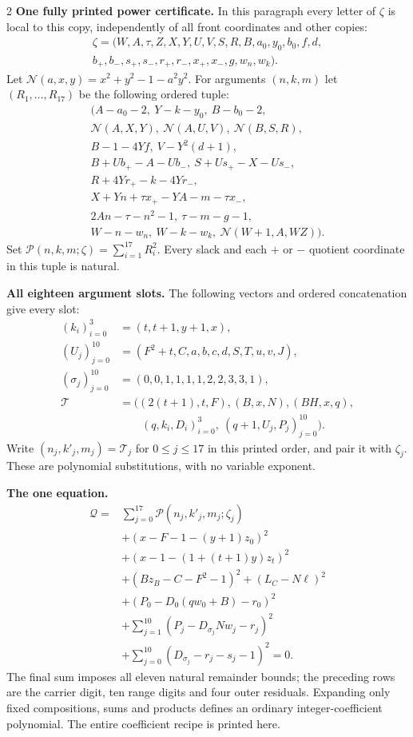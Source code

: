 \documentclass[10pt,letterpaper]{article}
\newcommand{\PP}{\mathcal P}
\newcommand{\QQ}{\mathcal Q}
\begin{document}
\begin{multicols}{2}
\textbf{One fully printed power certificate.}
In this paragraph every letter of $\zeta$ is local to this copy,
independently of all front coordinates and other copies:
\[
\begin{gathered}
\zeta=(W,A,\tau,Z,X,Y,U,V,S,R,B,a_0,y_0,b_0,f,d,\\
b_+,b_-,s_+,s_-,r_+,r_-,x_+,x_-,g,w_n,w_k).
\end{gathered}
\]
Let $\mathcal N(a,x,y)=x^2+y^2-1-a^2y^2$. For arguments $(n,k,m)$
let $(R_1,\ldots,R_{17})$ be the following ordered tuple:
\[
\begin{gathered}
\bigl(A-a_0-2,\ Y-k-y_0,\ B-b_0-2,\\
\mathcal N(A,X,Y),\ \mathcal N(A,U,V),\ \mathcal N(B,S,R),\\
B-1-4Yf,\ V-Y^2(d+1),\\
B+Ub_+-A-Ub_-,\ S+Us_+-X-Us_-,\\
R+4Yr_+-k-4Yr_-,\\
X+Yn+\tau x_+-YA-m-\tau x_-,\\
2An-\tau-n^2-1,\ \tau-m-g-1,\\
W-n-w_n,\ W-k-w_k,\ \mathcal N(W+1,A,WZ)\bigr).
\end{gathered}
\]
Set $\PP(n,k,m;\zeta)=\sum_{i=1}^{17}R_i^2$. Every slack and
each $+$ or $-$ quotient coordinate in this tuple is natural.

\textbf{All eighteen argument slots.}
The following vectors and ordered concatenation give every slot:
\[
\begin{aligned}
(k_i)_{i=0}^3&=(t,t+1,y+1,x),\\
(U_j)_{j=0}^{10}&=(F^2+t,C,a,b,c,d,S,T,u,v,J),\\
(\sigma_j)_{j=0}^{10}&=(0,0,1,1,1,1,2,2,3,3,1),\\
\mathcal T&=\bigl((2(t+1),t,F),(B,x,N),(BH,x,q),\\
&\qquad(q,k_i,D_i)_{i=0}^3,\ (q+1,U_j,P_j)_{j=0}^{10}\bigr).
\end{aligned}
\]
Write $(n_j,k'_j,m_j)=\mathcal T_j$ for $0\le j\le17$ in this
printed order, and pair it with $\zeta_j$. These are polynomial
substitutions, with no variable exponent.

\textbf{The one equation.}
\[
\boxed{\begin{aligned}
\QQ={}&\sum_{j=0}^{17}\PP(n_j,k'_j,m_j;\zeta_j)\\
&+(x-F-1-(y+1)z_0)^2\\
&+(x-1-(1+(t+1)y)z_t)^2\\
&+(Bz_B-C-F^2-1)^2+(L_C-N\ell)^2\\
&+(P_0-D_0(qw_0+B)-r_0)^2\\
&+\sum_{j=1}^{10}(P_j-D_{\sigma_j}Nw_j-r_j)^2\\
&+\sum_{j=0}^{10}(D_{\sigma_j}-r_j-s_j-1)^2=0.
\end{aligned}}
\]
The final sum imposes all eleven natural remainder bounds; the preceding
rows are the carrier digit, ten range digits and four outer residuals.
Expanding only fixed compositions, sums and products defines an ordinary
integer-coefficient polynomial. The entire coefficient recipe is printed here.


\end{multicols}
\end{document}
